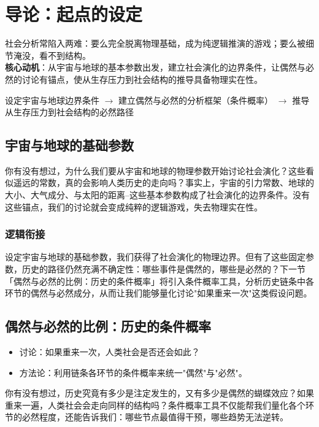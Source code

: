 \documentclass[openany]{book} %
\begin{document}
	\chapter{导论：起点的设定}

	\begin{motivation}
		社会分析常陷入两难：要么完全脱离物理基础，成为纯逻辑推演的游戏；要么被细节淹没，看不到结构。\\
		\textbf{核心动机}：从宇宙与地球的基本参数出发，建立社会演化的边界条件，让偶然与必然的讨论有锚点，使从生存压力到社会结构的推导具备物理实在性。
	\end{motivation}

	\begin{logicmap}
		设定宇宙与地球边界条件
		$\rightarrow$ 建立偶然与必然的分析框架（条件概率）
		$\rightarrow$ 推导从生存压力到社会结构的必然路径
	\end{logicmap}

	\section{宇宙与地球的基础参数}

你有没有想过，为什么我们要从宇宙和地球的物理参数开始讨论社会演化？这些看似遥远的常数，真的会影响人类历史的走向吗？事实上，宇宙的引力常数、地球的大小、大气成分、与太阳的距离--这些基本参数构成了社会演化的边界条件。没有这些锚点，我们的讨论就会变成纯粹的逻辑游戏，失去物理实在性。

	\subsection{逻辑衔接}
设定宇宙与地球的基础参数，我们获得了社会演化的物理边界。但有了这些固定参数，历史的路径仍然充满不确定性：哪些事件是偶然的，哪些是必然的？下一节「偶然与必然的比例：历史的条件概率」将引入条件概率工具，分析历史链条中各环节的偶然与必然成分，从而让我们能够量化讨论"如果重来一次"这类假设问题。

	\section{偶然与必然的比例：历史的条件概率}
	\begin{itemize}
		\item 讨论：如果重来一次，人类社会是否还会如此？
		\item 方法论：利用链条各环节的条件概率来统一"偶然"与"必然"。
	\end{itemize}

你有没有想过，历史究竟有多少是注定发生的，又有多少是偶然的蝴蝶效应？如果重来一遍，人类社会会走向同样的结构吗？条件概率工具不仅能帮我们量化各个环节的必然程度，还能告诉我们：哪些节点最值得干预，哪些趋势无法逆转。
\end{document}
